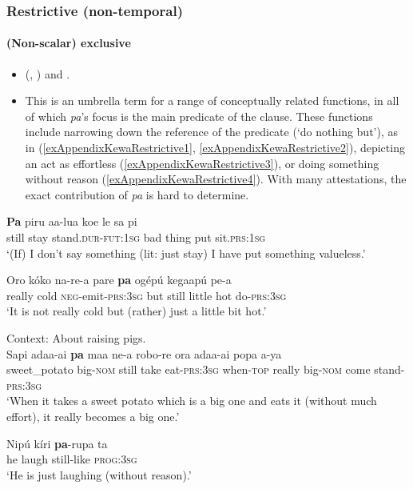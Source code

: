 \subsubsection{Restrictive (non-temporal)}
\paragraph{(Non-scalar) exclusive}\label{appendixKewaRestrictive}
\begin{itemize}
	\item \citeauthor{Franklin1971} (\citeyear[69]{Franklin1971}, \citeyear[42]{Franklin2007}) and \textcite[82]{Yarapea2006}.
	\item This is an umbrella term for a range of conceptually related functions, in all of which \textit{pa}'s focus is the main predicate of the clause. These functions include narrowing down the reference of the predicate (\lq do nothing but'), as in (\ref{exAppendixKewaRestrictive1}, \ref{exAppendixKewaRestrictive2}), depicting an act as effortless (\ref{exAppendixKewaRestrictive3}), or doing something without reason (\ref{exAppendixKewaRestrictive4}). With many attestations, the exact contribution of \textit{pa} is hard to determine.
\end{itemize}

\begin{exe}
	\ex \label{exAppendixKewaRestrictive1}
	\gll \textbf{Pa} piru aa-lua koe le sa pi\\
still stay stand.\textsc{dur}-\textsc{fut}:1\textsc{sg} bad thing put sit.\textsc{prs}:1\textsc{sg}\\
	\glt \lq (If) I don’t say something (lit: just stay) I have put something valueless.' \parencite[311–312]{Yarapea2006}

	\ex \label{exAppendixKewaRestrictive2}
	\gll Oro kóko na-re-a pare \textbf{pa} ogépú kegaapú pe-a\\
really cold \textsc{neg}-emit-\textsc{prs}:3\textsc{sg}  but still little hot do-\textsc{prs}:3\textsc{sg}\\
	\glt \lq It is not really cold but (rather) just a little bit hot.' \parencite[116]{Franklin1971}

	\ex \label{exAppendixKewaRestrictive3}
	Context: About raising pigs.\\
	\gll Sapi adaa-ai \textbf{pa} maa ne-a robo-re ora adaa-ai popa a-ya\\
sweet\_potato big-\textsc{nom} still take eat-\textsc{prs}:3\textsc{sg} when-\textsc{top} really big-\textsc{nom} come stand-\textsc{prs}:3\textsc{sg}\\
	\glt \lq When it takes a sweet potato which is a big one and eats it (without much effort), it really becomes a big one.' \parencite[286]{Yarapea2006}

	\ex \label{exAppendixKewaRestrictive4}
	\gll Nipú kíri \textbf{pa}-rupa ta\\
	he laugh still-like \textsc{prog}:3\textsc{sg}\\
	\glt \lq He is just laughing (without reason).' \parencite[34]{Franklin1971}
\end{exe}

